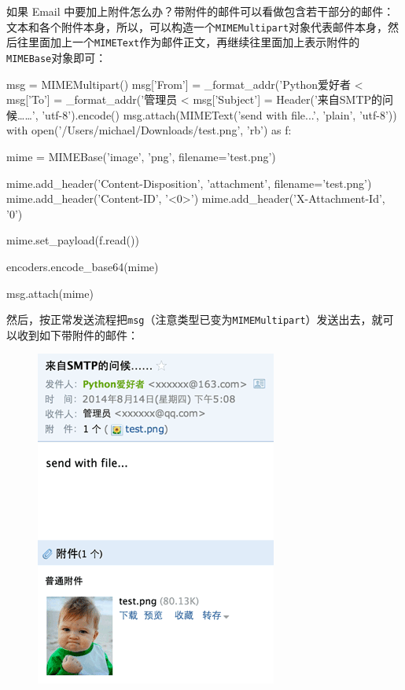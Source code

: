 如果 Email
中要加上附件怎么办？带附件的邮件可以看做包含若干部分的邮件：文本和各个附件本身，所以，可以构造一个\texttt{MIMEMultipart}对象代表邮件本身，然后往里面加上一个\texttt{MIMEText}作为邮件正文，再继续往里面加上表示附件的\texttt{MIMEBase}对象即可：

\begin{pythoncode}
msg = MIMEMultipart()
msg['From'] = _format_addr('Python爱好者 <%
msg['To'] = _format_addr('管理员 <%
msg['Subject'] = Header('来自SMTP的问候……', 'utf-8').encode()
msg.attach(MIMEText('send with file...', 'plain', 'utf-8'))
with open('/Users/michael/Downloads/test.png', 'rb') as f:
    
    mime = MIMEBase('image', 'png', filename='test.png')
    
    mime.add_header('Content-Disposition', 'attachment', filename='test.png')
    mime.add_header('Content-ID', '<0>')
    mime.add_header('X-Attachment-Id', '0')
    
    mime.set_payload(f.read())
    
    encoders.encode_base64(mime)
    
    msg.attach(mime)
\end{pythoncode}

然后，按正常发送流程把\texttt{msg}（注意类型已变为\texttt{MIMEMultipart}）发送出去，就可以收到如下带附件的邮件：

 
 \begin{figure}[htp]
	\centering
	\includegraphics[width=0.6\linewidth]{fig/967464310443456.png}
\end{figure}


